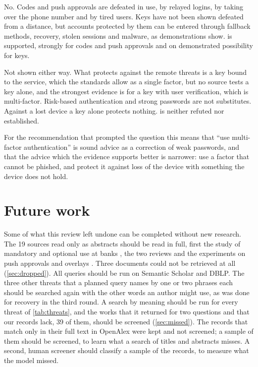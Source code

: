 \rqsufficient*
No.
Codes and push approvals are defeated in use, by relayed logins, by
taking over the phone number and by tired users.
Keys have not been shown defeated from a distance, but accounts
protected by them can be entered through fallback methods, recovery,
stolen sessions and malware, as demonstrations show.
 is supported, strongly for codes and push approvals
and on demonstrated possibility for keys.

\rqnecessary*
Not shown either way.
What protects against the remote threats is a key bound to the service,
which the standards allow as a single factor, but no source tests a key
alone, and the strongest evidence is for a key with user verification,
which is multi-factor.
Risk-based authentication and strong passwords are not substitutes.
Against a lost device a key alone protects nothing.
 is neither refuted nor established.

For the recommendation that prompted the question this means that
\enquote{use multi-factor authentication} is sound advice as a
correction of weak passwords, and that the advice which the evidence
supports better is narrower: use a factor that cannot be phished, and
protect it against loss of the device with something the device does
not hold.


\section{Future work}\label{sec:future}

Some of what this review left undone can be completed without new
research.
The 19 sources read only as abstracts should be read in full, first the
study of mandatory and optional use at banks
\autocite{Kamar2026TwoFactorBanks}, the two reviews
\autocite{Wang2019CaseTwoFactor,Woods2023MetaReview} and the
experiments on push approvals and overlays
\autocite{Jubur2021PushBypass,Mahdad2024FIDOLA}.
Three documents could not be retrieved at all (\cref{sec:dropped}).
All queries should be run on Semantic Scholar and DBLP.
The three other threats that a planned query names by one or two
phrases each should be searched again with the other words an author
might use, as was done for recovery in the third round.
A search by meaning should be run for every threat of
\cref{tab:threats}, and the works that it returned for two questions
and that our records lack, 39 of them, should be screened
(\cref{sec:missed}).
The records that match only in their full text in OpenAlex were kept
and not screened; a sample of them should be screened, to learn what a
search of titles and abstracts misses.
A second, human screener should classify a sample of the records, to
measure what the model missed.

